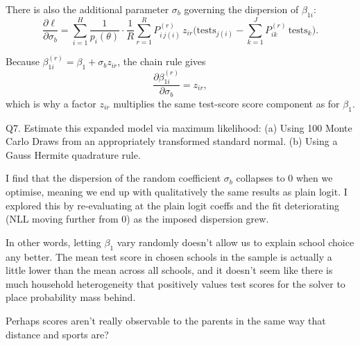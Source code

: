 \documentclass{article}
\begin{document}
There is also the additional parameter $\sigma_b$ governing the dispersion of $\beta_{1i}$:
\[
\frac{\partial \ell}{\partial \sigma_b}
=\sum_{i=1}^H \frac{1}{p_i(\theta)}\cdot\frac{1}{R}\sum_{r=1}^R 
P_{i\,j(i)}^{(r)}\,z_{ir}\Big( \text{tests}_{j(i)} - \sum_{k=1}^J P_{ik}^{(r)}\,\text{tests}_k \Big).
\]

Because $\beta_{1i}^{(r)} = \beta_1 + \sigma_b z_{ir}$, the chain rule gives 
\[
\frac{\partial \beta_{1i}^{(r)}}{\partial \sigma_b} = z_{ir},
\]
which is why a factor $z_{ir}$ multiplies the same test-score score component as for $\beta_1$.




\begin{tcolorbox}
Q7. Estimate this expanded model via maximum likelihood: (a) Using 100 Monte Carlo Draws from an appropriately transformed standard normal. (b) Using a Gauss Hermite quadrature rule.
\end{tcolorbox}

I find that the dispersion of the random coefficient $\sigma_b$ collapses to 0 when we optimise, meaning we end up with qualitatively the same results as plain logit. I explored this by re-evaluating at the plain logit coeffs and the fit deteriorating (NLL moving further from 0) as the imposed dispersion grew. 

\vspace{5mm}

In other words, letting $\beta_1$ vary randomly doesn't allow us to explain  school choice any better. The mean test score in chosen schools in the sample is actually a little lower than the mean across all schools, and it doesn't seem like there is much household heterogeneity that positively values test scores for the solver to place probability mass behind.  

\vspace{5mm}


Perhaps scores aren't really observable to the parents in the same way that distance and sports are?

\begin{table}[H]
\centering
{}
\caption{Estimation results for logit models.}
\end{table}
\end{document}
